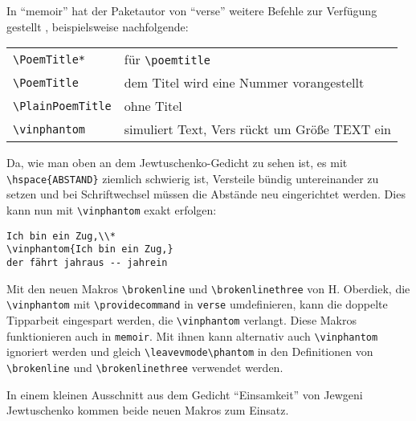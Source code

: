In "`memoir"' hat der Paketautor von "`verse"' weitere Befehle
zur Verfügung gestellt \cite[Kap.\,14]{wilson}, beispielsweise nachfolgende:

\begin{tabular}{ll}
 \verb|\PoemTitle*| & für  \verb|\poemtitle|\\
 \verb|\PoemTitle|  & dem Titel wird eine Nummer vorangestellt\\
 \verb|\PlainPoemTitle| & ohne Titel \\
\verb|\vinphantom| & simuliert Text, Vers rückt um Größe TEXT ein \\
\end{tabular}

Da, wie man oben an dem Jewtuschenko-Gedicht zu sehen ist, es mit 
\verb|\hspace{ABSTAND}| ziemlich schwierig ist, Versteile bündig untereinander 
zu setzen und bei Schriftwechsel müssen die Abstände neu eingerichtet werden. Dies
kann nun 
mit \verb|\vinphantom| exakt erfolgen:

\begin{lstlisting}
Ich bin ein Zug,\\*
\vinphantom{Ich bin ein Zug,}
der fährt jahraus -- jahrein
\end{lstlisting}

Mit den neuen Makros \verb|\brokenline| und \verb|\brokenlinethree|
von H. Oberdiek, die \verb|\vinphantom| 
mit \verb|\providecommand| in \texttt{verse} umdefinieren, kann die doppelte
Tipparbeit eingespart werden, die \verb|\vinphantom| verlangt. Diese Makros 
funktionieren auch in \texttt{memoir}.
Mit ihnen kann alternativ auch \verb|\vinphantom| ignoriert werden und gleich 
\verb|\leavevmode\phantom| in den Definitionen von \verb|\brokenline| und 
\verb|\brokenlinethree| verwendet werden.

In einem kleinen Ausschnitt aus dem Gedicht "`Einsamkeit"' von Jewgeni Jewtuschenko
kommen beide neuen Makros zum Einsatz.


